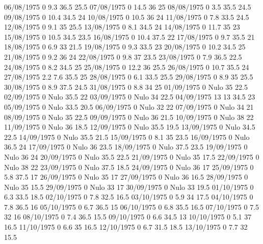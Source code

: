 06/08/1975  0      9.3    36.5   25.5 
07/08/1975  0      14.5   36     25 
08/08/1975  0      3.5    35.5   24.5 
09/08/1975  0      10.4   34.5   24 
10/08/1975  0      10.5   36     24 
11/08/1975  0      7.8    33.5   24.5 
12/08/1975  0      9.1    35     25.5 
13/08/1975  0      8.1    34.5   24 
14/08/1975  0      11.7   35     23 
15/08/1975  0      10.5   34.5   23.5 
16/08/1975  0      10.4   37.5   22 
17/08/1975  0      9.7    35.5   21 
18/08/1975  0      6.9    33     21.5 
19/08/1975  0      9.3    33.5   23 
20/08/1975  0      10.2   34.5   25 
21/08/1975  0      9.2    36     24 
22/08/1975  0      9.8    37     23.5 
23/08/1975  0      7.9    36.5   22.5 
24/08/1975  0      8.2    34.5   25 
25/08/1975  0      12.2   36     25.5 
26/08/1975  0      10.7   35.5   24 
27/08/1975  2.2    7.6    35.5   25 
28/08/1975  0      6.1    33.5   25.5 
29/08/1975  0      8.9    35     25.5 
30/08/1975  0      8.9    37.5   24.5 
31/08/1975  0      8.8    34     25 
01/09/1975  0     Nulo    35     22.5 
02/09/1975  0     Nulo    35.5   22 
03/09/1975  0     Nulo    34     22.5 
04/09/1975  13     13     34.5   23 
05/09/1975  0     Nulo    33.5   20.5 
06/09/1975  0     Nulo    32     22 
07/09/1975  0     Nulo    34     21 
08/09/1975  0     Nulo    35     22.5 
09/09/1975  0     Nulo    36     21.5 
10/09/1975  0     Nulo    38     22 
11/09/1975  0     Nulo    36     18.5 
12/09/1975  0     Nulo    35.5   19.5 
13/09/1975  0     Nulo    34.5   22.5 
14/09/1975  0     Nulo    35.5   21.5 
15/09/1975  0      8.1    35     23.5 
16/09/1975  0     Nulo    36.5   24 
17/09/1975  0     Nulo    36     23.5 
18/09/1975  0     Nulo    37.5   23.5 
19/09/1975  0     Nulo    36     24 
20/09/1975  0     Nulo    35.5   22.5 
21/09/1975  0     Nulo    35     17.5 
22/09/1975  0     Nulo    38     22 
23/09/1975  0     Nulo    37.5   18.5 
24/09/1975  0     Nulo    36     17 
25/09/1975  0      5.8    37.5   17 
26/09/1975  0     Nulo    35     17 
27/09/1975  0     Nulo    36     16.5 
28/09/1975  0     Nulo    35     15.5 
29/09/1975  0     Nulo    33     17 
30/09/1975  0     Nulo    33     19.5 
01/10/1975  0      6.3    33.5   18.5 
02/10/1975  0      7.8    32.5   16.5 
03/10/1975  0      5.9    34     17.5 
04/10/1975  0      7.8    36.5   16 
05/10/1975  0      6.7    36.5   15 
06/10/1975  0      6.8    35.5   16.5 
07/10/1975  0      7.5    32     16 
08/10/1975  0      7.4    36.5   15.5 
09/10/1975  0      6.6    34.5   13 
10/10/1975  0      5.1    37     16.5 
11/10/1975  0      6.6    35     16.5 
12/10/1975  0      6.7    31.5   18.5 
13/10/1975  0      7.7    32     15.5 
